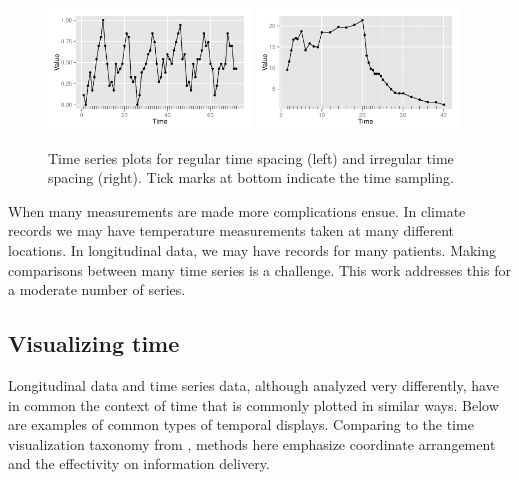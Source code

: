 \documentclass[12pt]{article}
\begin{document}
\begin{figure}[h]
\begin{centering}
\includegraphics[width=0.48\textwidth]{graph/pipeline-01-regular} \includegraphics[width=0.48\textwidth]{graph/pipeline-01-irregular}
\end{centering}

\caption{\label{fig:Time-series-plots}Time series plots for regular time spacing
 (left) and irregular time spacing  (right). Tick marks at bottom indicate the time sampling.}
\end{figure}

When many measurements are made more complications ensue. In climate records we may have temperature measurements taken at many different locations. In longitudinal data, we may have records for many patients. Making comparisons between many time series is a challenge. This work addresses this for a moderate number of series.



\subsection{Visualizing time}

Longitudinal data and time series data, although analyzed
very differently, have in common the context of time that
is commonly plotted in similar ways. Below are examples of
common types of temporal displays. Comparing to the time
visualization taxonomy from \citet{aigner2011visualization},
methods here emphasize coordinate arrangement and the
effectivity on information delivery.
\end{document}
